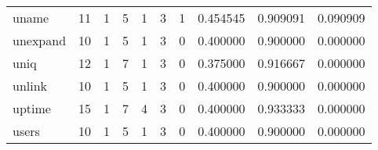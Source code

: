 \begin{tabular}{lrrrrrrrrr}
uname     &                                       11 &                                                  1 &                                                  5 &                                                  1 &                                                  3 &                                                  1 &                                           0.454545 &                               0.909091 &                             0.090909 \\
unexpand  &                                       10 &                                                  1 &                                                  5 &                                                  1 &                                                  3 &                                                  0 &                                           0.400000 &                               0.900000 &                             0.000000 \\
uniq      &                                       12 &                                                  1 &                                                  7 &                                                  1 &                                                  3 &                                                  0 &                                           0.375000 &                               0.916667 &                             0.000000 \\
unlink    &                                       10 &                                                  1 &                                                  5 &                                                  1 &                                                  3 &                                                  0 &                                           0.400000 &                               0.900000 &                             0.000000 \\
uptime    &                                       15 &                                                  1 &                                                  7 &                                                  4 &                                                  3 &                                                  0 &                                           0.400000 &                               0.933333 &                             0.000000 \\
users     &                                       10 &                                                  1 &                                                  5 &                                                  1 &                                                  3 &                                                  0 &                                           0.400000 &                               0.900000 &                             0.000000 \\

\end{tabular}
